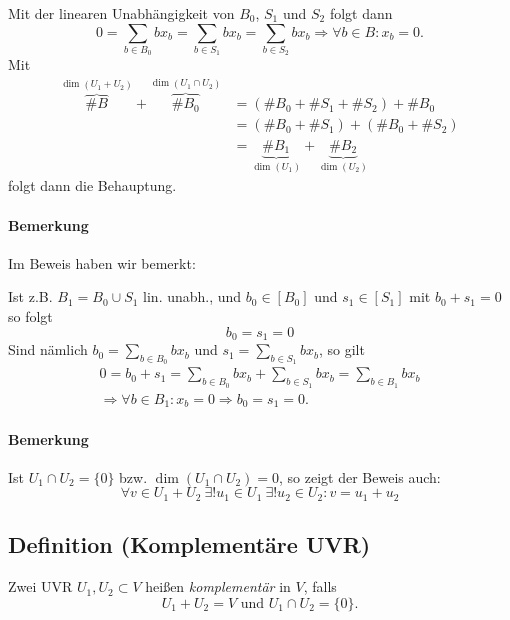  		Mit der linearen Unabhängigkeit von $ B_0$, $S_1 $ und $ S_2 $ folgt dann
 		\[
 			0 = \sum_{b\in B_0}bx_b = \sum_{b\in S_1}bx_b = \sum_{b\in S_2}bx_b \Rightarrow \forall b\in B: x_b = 0.
 		\]
 		Mit
 		\begin{align*}
 			\overbrace{\#B}^{\dim(U_1+U_2)} + \overbrace{\#B_0}^{\dim(U_1\cap U_2)} & = (\#B_0 + \#S_1 + \#S_2) + \#B_0                               \\
 			                                                                        & = (\#B_0+\#S_1)+(\#B_0 + \#S_2)                                 \\
 			                                                                        & = \underbrace{\#B_1}_{\dim(U_1)}+\underbrace{\#B_2}_{\dim(U_2)}
 		\end{align*}
 		folgt dann die Behauptung.

 	\paragraph{Bemerkung}
 		Im Beweis haben wir bemerkt:

 		Ist z.B. $ B_1 = B_0\cup S_1 $ lin. unabh., und $ b_0\in [B_0] $ und $ s_1\in [S_1] $ mit $b_0 + s_1 = 0$ so folgt
 		\[
 			b_0 = s_1 = 0
 		\]
 		Sind nämlich $ b_0 = \sum_{b\in B_0} bx_b $ und $ s_1 = \sum_{b\in S_1}bx_b $, so gilt
 		\begin{gather*}
 			0 = b_0+s_1 = \sum_{b\in B_0} bx_b+\sum_{b\in S_1} bx_b = \sum_{b\in B_1} bx_b \\ \Rightarrow \forall b\in B_1: x_b = 0\Rightarrow b_0 = s_1 = 0.
 		\end{gather*}

 	\paragraph{Bemerkung}
 		Ist $ U_1\cap U_2 = \{0\} $ bzw. $ \dim (U_1\cap U_2)  = 0 $, so zeigt der Beweis auch:
 		\[
 			\forall v\in U_1+U_2\ \exists ! u_1 \in U_1\ \exists ! u_2\in U_2: v= u_1+u_2
 		\]

 \subsection{Definition (Komplementäre UVR)}
 	\begin{Definition}
 		Zwei UVR $ U_1,U_2 \subset V $ heißen \emph{komplementär} in $ V $, falls
 		\[
 			U_1+U_2=V\text{ und } U_1\cap U_2 = \{0\}.
 		\]
 	\end{Definition}

